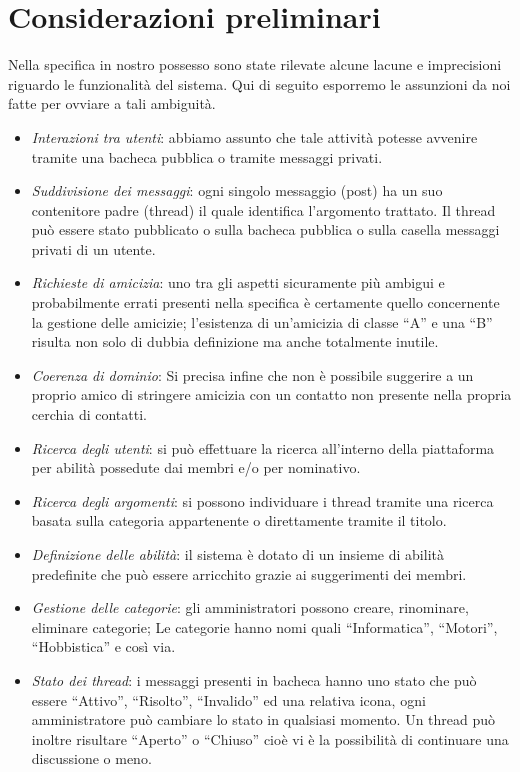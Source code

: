 \documentclass[a4paper,12pt]{article}
\begin{document}
\section{Considerazioni preliminari}
Nella specifica in nostro possesso sono state rilevate alcune lacune e imprecisioni riguardo le funzionalità del sistema.
Qui di seguito esporremo le assunzioni da noi fatte per ovviare a tali ambiguità.
\begin{itemize}
\item \textit{Interazioni tra utenti}: abbiamo assunto che tale attività potesse avvenire tramite una bacheca pubblica o tramite messaggi privati.
\item \textit{Suddivisione dei messaggi}: ogni singolo messaggio (post) ha un suo contenitore padre (thread) il quale identifica l’argomento trattato. Il thread può essere stato pubblicato o sulla bacheca pubblica o sulla casella messaggi privati di un utente.
\item \textit{Richieste di amicizia}: uno tra gli aspetti sicuramente più ambigui e probabilmente errati presenti nella specifica è certamente quello concernente la gestione delle amicizie; l’esistenza di un’amicizia di classe “A” e una “B” risulta non solo di dubbia definizione ma anche totalmente inutile.
\item \textit{Coerenza di dominio}: Si precisa infine che non è possibile suggerire a un proprio amico di stringere amicizia con un contatto non presente nella propria cerchia di contatti.
\item \textit{Ricerca degli utenti}: si può effettuare la ricerca all’interno della piattaforma per abilità possedute dai membri e/o per nominativo.
\item \textit{Ricerca degli argomenti}: si possono individuare i thread tramite una ricerca basata sulla categoria appartenente o direttamente tramite il titolo.
\item \textit{Definizione delle abilità}: il sistema è dotato di un insieme di abilità predefinite che può essere arricchito grazie ai suggerimenti dei membri.
\item \textit{Gestione delle categorie}: gli amministratori possono creare, rinominare, eliminare categorie; Le categorie hanno nomi quali “Informatica”, “Motori”, “Hobbistica” e così via.
\item \textit{Stato dei thread}: i messaggi presenti in bacheca hanno uno stato che può essere “Attivo”, “Risolto”, “Invalido” ed una relativa icona, ogni amministratore può cambiare lo stato in qualsiasi momento. Un thread può inoltre risultare “Aperto” o “Chiuso” cioè vi è la possibilità di continuare una discussione o meno.
\end{itemize}
\end{document}
